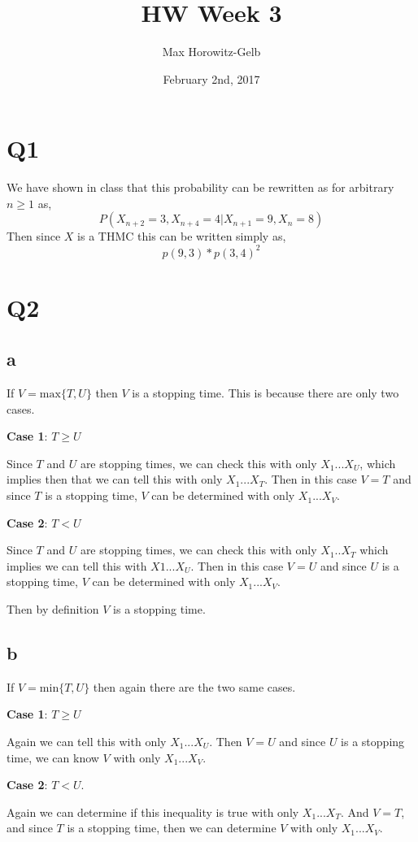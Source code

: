 \documentclass{article}
\title{HW Week 3}
\author{Max Horowitz-Gelb}
\date{February 2nd, 2017}
\begin{document}
\maketitle
\section*{Q1}
We have shown in class that this probability can be rewritten as for arbitrary $n \geq 1$ as, 
\[
P(X_{n+2} = 3, X_{n+4} = 4 | X_{n+1} = 9 , X_n = 8)
\]
Then since $X$ is a THMC this can be written simply as,
\[
p(9,3)*p(3,4)^2
\]

\section*{Q2}
\subsection*{a}
If $V = \text{max} \{T,U\}$ then $V$ is a stopping time. This is because there are only two cases.

\textbf{Case 1}: $T \geq U$

Since $T$ and $U$ are stopping times, we can check this with only $X_1 ... X_U$, which implies then that we can tell this with only $X_1 ... X_T$. Then in this case $V = T$ and since $T$ is a stopping time, $V$ can be determined with only $X_1 ... X_{V}$.

\textbf{Case 2}: $T < U$

Since $T$ and $U$ are stopping times, we can check this with only $X_1 .. X_T$ which implies we can tell this with $X1 ... X_U$. Then in this case $V = U$ and since $U$ is a stopping time, $V$ can be determined with only $X_1 ... X_{V}$.

Then by definition $V$ is a stopping time. 
\subsection*{b}
If $V = \text{min}\{T, U\}$ then again there are the two same cases.

\textbf{Case 1}: $T \geq U$

Again we can tell this with only $X_1 ... X_U$. Then $V = U$ and since $U$ is a stopping time, we can know $V$ with only $X_1 ... X_V$.

\textbf{Case 2}: $T < U$.

Again we can determine if this inequality is true with only $X_1 ... X_T$. And $V = T$, and since $T$ is a stopping time, then we can determine $V$ with only $X_1 ... X_V$.
\end{document}
